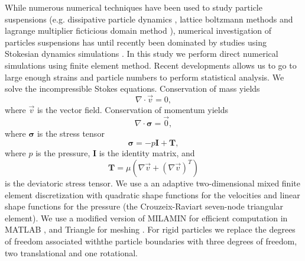 \documentclass[aps,pre,twocolumn,letterpaper,floatfix,showpacs]{revtex4}
\begin{document}
While numerous numerical techniques have been used to study particle suspensions (e.g. dissipative particle dynamics \cite{hoogerbrugge1992simulating}, lattice boltzmann methods \cite{ladd2001lattice} and lagrange multiplier ficticious domain method \cite{glowinski1999distributed}), numerical investigation of particles suspensions has until recently been dominated by studies using Stokesian dynamics simulations \cite{brady1988stokesian,brady1985rheology,ekiel2008stokesian}.
In this study we perform direct numerical simulations using finite element method. Recent developments allows us to go to large enough strains and particle numbers to perform statistical analysis. We solve the incompressible Stokes equations. Conservation of mass yields
 \begin{equation}
 \nabla \cdot \vec v  = 0,
 \end{equation}
 where $\vec v$ is the vector field. Conservation of momentum yields
 \begin{equation}
 \nabla \cdot \boldsymbol \sigma = \vec 0,
 \end{equation}
 where $\boldsymbol \sigma$ is the stress tensor
 \begin{equation}
\boldsymbol \sigma = -p  \boldsymbol I +  \boldsymbol T,
\end{equation}
where $p$ is the pressure, $\boldsymbol I$ is the identity matrix, and
 \begin{equation}
\boldsymbol T = \mu \left (   \nabla \vec v + (\nabla \vec v )^T \right )
\end{equation}
is the deviatoric stress tensor. We use a an adaptive two-dimensional mixed finite element discretization with quadratic shape functions for the velocities and linear shape functions for the pressure (the Crouzeix-Raviart seven-node triangular element). We use a modified version of MILAMIN for efficient computation in MATLAB \cite{dabrowski2008milamin}, and Triangle for meshing \cite{shewchuk1996triangle}. For rigid particles we replace the degrees of freedom associated withthe particle boundaries with three degrees of freedom, two translational and one rotational.
\end{document}
